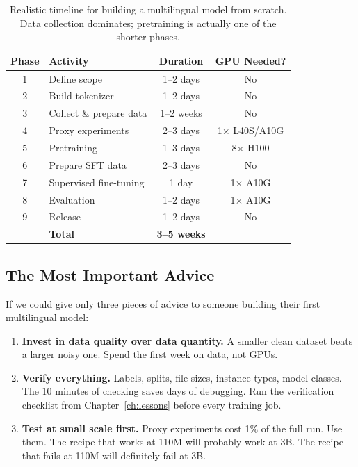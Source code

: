 \documentclass[11pt,a4paper]{article}
\begin{document}
\begin{table}[H]
\centering
\begin{tabular}{clcc}
\toprule
\textbf{Phase} & \textbf{Activity} & \textbf{Duration} & \textbf{GPU Needed?} \\
\midrule
1 & Define scope & 1--2 days & No \\
2 & Build tokenizer & 1--2 days & No \\
3 & Collect \& prepare data & 1--2 weeks & No \\
4 & Proxy experiments & 2--3 days & 1$\times$ L40S/A10G \\
5 & Pretraining & 1--3 days & 8$\times$ H100 \\
6 & Prepare SFT data & 2--3 days & No \\
7 & Supervised fine-tuning & 1 day & 1$\times$ A10G \\
8 & Evaluation & 1--2 days & 1$\times$ A10G \\
9 & Release & 1--2 days & No \\
\midrule
& \textbf{Total} & \textbf{3--5 weeks} & \\
\bottomrule
\end{tabular}
\caption{Realistic timeline for building a multilingual model from scratch. Data collection dominates; pretraining is actually one of the shorter phases.}
\label{tab:timeline}
\end{table}

\subsection{The Most Important Advice}

If we could give only three pieces of advice to someone building their first multilingual model:

\begin{enumerate}
    \item \textbf{Invest in data quality over data quantity.} A smaller clean dataset beats a larger noisy one. Spend the first week on data, not GPUs.
    
    \item \textbf{Verify everything.} Labels, splits, file sizes, instance types, model classes. The 10 minutes of checking saves days of debugging. Run the verification checklist from Chapter~\ref{ch:lessons} before every training job.
    
    \item \textbf{Test at small scale first.} Proxy experiments cost 1\% of the full run. Use them. The recipe that works at 110M will probably work at 3B. The recipe that fails at 110M will definitely fail at 3B.
\end{enumerate}
\end{document}

